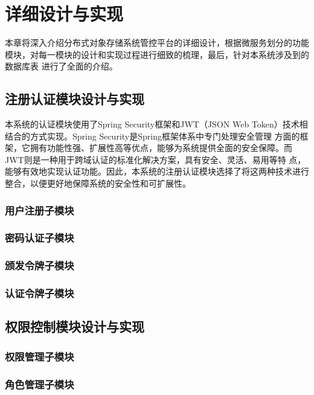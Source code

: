 \chapter{详细设计与实现}

本章将深入介绍分布式对象存储系统管控平台的详细设计，根据微服务划分的功能模块，对每一模块的设计和实现过程进行细致的梳理，最后，针对本系统涉及到的数据库表
进行了全面的介绍。

\section{注册认证模块设计与实现}

本系统的认证模块使用了Spring Security框架和JWT（JSON Web Token）技术相结合的方式实现。Spring Security是Spring框架体系中专门处理安全管理
方面的框架，它拥有功能性强、扩展性高等优点，能够为系统提供全面的安全保障。而JWT则是一种用于跨域认证的标准化解决方案，具有安全、灵活、易用等特
点，能够有效地实现认证功能。因此，本系统的注册认证模块选择了将这两种技术进行整合，以便更好地保障系统的安全性和可扩展性。

\subsection{用户注册子模块}

\subsection{密码认证子模块}

\subsection{颁发令牌子模块}

\subsection{认证令牌子模块}





\section{权限控制模块设计与实现}

\subsection{权限管理子模块}

\subsection{角色管理子模块}

